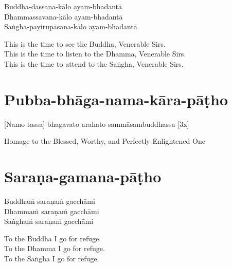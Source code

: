 Buddha-dassana-kālo ayam-bhadantā\\
Dhammassavana-kālo ayam-bhadantā\hyperlink{endnote122-appendix}{\hypertarget{endnote122-body}{}}\\
Saṅgha-payirupāsana-kālo ayam-bhadantā\hyperlink{endnote123-appendix}{\hypertarget{endnote123-body}{}}

\begin{english-verses}
  This is the time to see the Buddha, Venerable Sirs.\\
  This is the time to listen to the Dhamma, Venerable Sirs.\\
  This is the time to attend to the Saṅgha, Venerable Sirs.
\end{english-verses}

\suttaRef{[Thai]}

\section{Pubba-bhāga-nama-kāra-pāṭho}
\label{pubba-bhaga-nama-kara-patho}

\vspace{-1em}

[Namo tassa] bhagavato arahato sammāsambuddhassa \hfill{[3x]}

\begin{english-verses}
  Homage to the Blessed, Worthy, and Perfectly Enlightened One
\end{english-verses}

\vspace{1em}

\section{Saraṇa-gamana-pāṭho}
\label{sarana-gamana-patho}

\vspace{-1em}

Buddhaṁ saraṇaṁ gacchāmi\\
Dhammaṁ saraṇaṁ gacchāmi\\
Saṅghaṁ saraṇaṁ gacchāmi

\begin{english-verses}
  To the Buddha I go for refuge.\\
  To the Dhamma I go for refuge.\\
  To the Saṅgha I go for refuge.
\end{english-verses}

